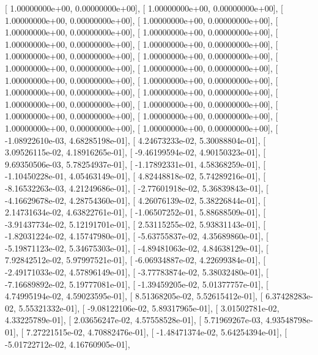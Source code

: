\documentclass{article}
\begin{document}
       [  1.00000000e+00,   0.00000000e+00],
       [  1.00000000e+00,   0.00000000e+00],
       [  1.00000000e+00,   0.00000000e+00],
       [  1.00000000e+00,   0.00000000e+00],
       [  1.00000000e+00,   0.00000000e+00],
       [  1.00000000e+00,   0.00000000e+00],
       [  1.00000000e+00,   0.00000000e+00],
       [  1.00000000e+00,   0.00000000e+00],
       [  1.00000000e+00,   0.00000000e+00],
       [  1.00000000e+00,   0.00000000e+00],
       [  1.00000000e+00,   0.00000000e+00],
       [  1.00000000e+00,   0.00000000e+00],
       [  1.00000000e+00,   0.00000000e+00],
       [  1.00000000e+00,   0.00000000e+00],
       [  1.00000000e+00,   0.00000000e+00],
       [  1.00000000e+00,   0.00000000e+00],
       [  1.00000000e+00,   0.00000000e+00],
       [  1.00000000e+00,   0.00000000e+00],
       [  1.00000000e+00,   0.00000000e+00],
       [  1.00000000e+00,   0.00000000e+00],
       [  1.00000000e+00,   0.00000000e+00],
       [  1.00000000e+00,   0.00000000e+00],
       [ -1.08922610e-03,   4.68285198e-01],
       [  4.24673233e-02,   5.30088804e-01],
       [  3.09526115e-02,   4.18916265e-01],
       [ -9.46199594e-02,   4.90150323e-01],
       [  9.69350506e-03,   5.78254937e-01],
       [ -1.17892331e-01,   4.58368259e-01],
       [ -1.10450228e-01,   4.05463149e-01],
       [  4.82448818e-02,   5.74289216e-01],
       [ -8.16532263e-03,   4.21249686e-01],
       [ -2.77601918e-02,   5.36839843e-01],
       [ -4.16629678e-02,   4.28754360e-01],
       [  4.26076139e-02,   5.38226844e-01],
       [  2.14731634e-02,   4.63822761e-01],
       [ -1.06507252e-01,   5.88688509e-01],
       [ -3.91437734e-02,   5.12191701e-01],
       [  2.53115255e-02,   5.93831143e-01],
       [ -1.82031224e-02,   4.15747980e-01],
       [ -5.63755837e-02,   4.35689860e-01],
       [ -5.19871123e-02,   5.34675303e-01],
       [ -4.89481063e-02,   4.84638129e-01],
       [  7.92842512e-02,   5.97997521e-01],
       [ -6.06934887e-02,   4.22699384e-01],
       [ -2.49171033e-02,   4.57896149e-01],
       [ -3.77783874e-02,   5.38032480e-01],
       [ -7.16689892e-02,   5.19777081e-01],
       [ -1.39459205e-02,   5.01377757e-01],
       [  4.74995194e-02,   4.59023595e-01],
       [  8.51368205e-02,   5.52615412e-01],
       [  6.37428283e-02,   5.55321332e-01],
       [ -9.08122106e-02,   5.89317965e-01],
       [  3.01502781e-02,   4.33225789e-01],
       [  2.03656247e-02,   4.57558528e-01],
       [  5.71969267e-03,   4.93548798e-01],
       [  7.27221515e-02,   4.70882476e-01],
       [ -1.48471374e-02,   5.64254394e-01],
       [ -5.01722712e-02,   4.16760905e-01],
\end{document}
